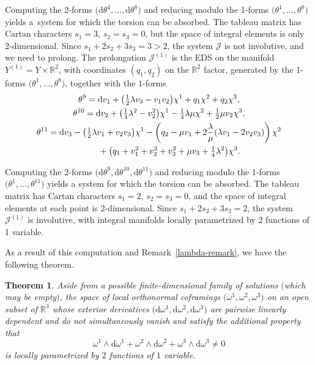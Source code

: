 \documentclass[pdftex]{sigma}
\numberwithin{equation}{section}
\newtheorem{Theorem}{Theorem}[section]
\renewcommand{\d}{\mathrm{d}}%
\newcommand{\cJ}{{\mathcal J}}
\newcommand{\bbR}{{\mathbb R}}
\begin{document}
Computing the 2-forms $\big(\d\theta^4,\ldots,\d\theta^8\big)$ and reducing modulo the 1-forms $\big(\theta^1, \ldots, \theta^8\big)$ yields a~system for which the torsion can be absorbed. The tableau matrix has Cartan characters $s_1 = 3$, $s_2 = s_3 = 0$, but the space of integral elements is only 2-dimensional. Since $s_1 + 2 s_2 + 3 s_3 = 3 > 2$, the system $\cJ$ is not involutive, and we need to prolong. The prolongation $\cJ^{(1)}$ is the EDS on the manifold $Y^{(1)} = Y \times \bbR^2$, with coordinates $(q_1, q_2)$ on the $\bbR^2$ factor, generated by the 1-forms $\big(\theta^1,\ldots, \theta^8\big)$, together with the $1$-forms
\begin{gather*}%
\theta^9 = \d v_1 + \big(\tfrac{1}{2} \lambda v_3 - v_1 v_2 \big) \chi^1 + q_1 \chi^2 + q_2 \chi^3 , \\
\theta^{10} = \d v_2 + \big(\tfrac{1}{4} \lambda^2 - v_2^2 \big) \chi^1 - \tfrac{1}{4} \lambda \mu \chi^2 + \tfrac{1}{2} \mu v_2 \chi^3 , \\
\theta^{11} = \d v_3 - \big( \tfrac{1}{2} \lambda v_1 + v_2 v_3 \big) \chi^1 - \left( q_2 - \mu v_1 + 2 \frac{\lambda}{\mu}(\lambda v_1 - 2 v_2 v_3 )\right) \chi^2 \\
\hphantom{\theta^{11} =}{} + \big( q_1 + v_1^2 + v_2^2 + v_3^2 + \mu v_3 + \tfrac{1}{4} \lambda^2 \big) \chi^3.
\end{gather*}

Computing the 2-forms $\big(\d\theta^9,\d\theta^{10},\d\theta^{11}\big)$ and reducing modulo the 1-forms $\big(\theta^1, \ldots, \theta^{11}\big)$ yields a system for which the torsion can be absorbed. The tableau matrix has Cartan characters $s_1 = 2$, $s_2 = s_3 = 0$, and the space of integral elements at each point is 2-dimensional. Since $s_1 + 2 s_2 + 3 s_3 = 2$, the system $\cJ^{(1)}$ is involutive, with integral manifolds locally parametrized by 2 functions of 1 variable.

As a result of this computation and Remark~\ref{lambda-remark}, we have the following theorem.

\begin{Theorem}\label{lambda-nonzero-function-count-theorem} Aside from a possible finite-dimensional family of solutions $($which may be empty$)$, the space of local orthonormal coframings $\big(\omega^1, \omega^2, \omega^3\big)$ on an open subset of $\bbR^3$ whose exterior derivatives $\big(\d\omega^1, \d\omega^2, \d\omega^3\big)$ are pairwise linearly dependent and do not simultaneously vanish and satisfy the additional property that
\[ \omega^1 \wedge \d \omega^1 + \omega^2 \wedge \d \omega^2 + \omega^3 \wedge \d \omega^3 \neq 0 \]
is locally parametrized by $2$ functions of $1$ variable.
\end{Theorem}
\end{document}
